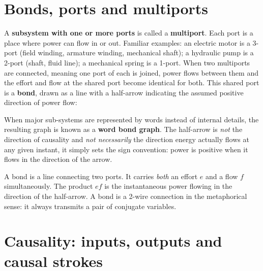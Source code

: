 \section{Bonds, ports and multiports}

A \textbf{subsystem with one or more ports} is called a \textbf{multiport}.
Each port is a place where power can flow in or out.
Familiar examples: an electric motor is a 3-port (field winding, armature winding, mechanical shaft);
a hydraulic pump is a 2-port (shaft, fluid line); a mechanical spring is a 1-port.
When two multiports are connected, meaning one port of each is joined, power flows between them and the effort and flow at the shared port become identical for both.
This shared port is a \textbf{bond}, drawn as a line with a half-arrow indicating the assumed positive direction of power flow:

\begin{center}
\end{center}

When major sub-systems are represented by words instead of internal details, the resulting graph is known as a \textbf{word bond graph}. 
The half-arrow is \emph{not} the direction of causality and \emph{not necessarily} the direction energy actually flows at any given instant, it simply sets the sign convention: power is positive when it flows in the direction of the arrow.

\begin{defbox}[Bond]
A bond is a line connecting two ports. It carries \emph{both} an effort $e$ and a flow $f$ simultaneously.
The product $ef$ is the instantaneous power flowing in the direction of the half-arrow.
A bond is a 2-wire connection in the metaphorical sense: it always transmits a pair of conjugate variables.
\end{defbox}

\section{Causality: inputs, outputs and causal strokes}


